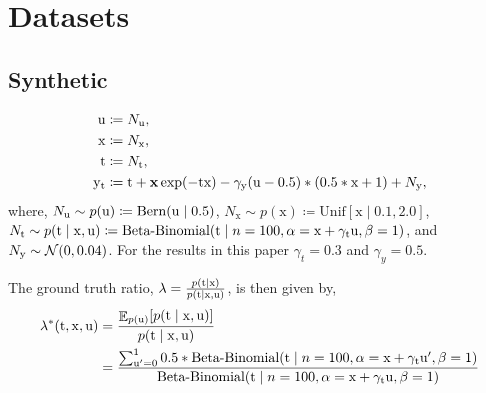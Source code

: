 \section{Datasets}
\label{app:datasets}
\subsection{Synthetic}
\label{app:synthetic}
\begin{equation}
    \begin{split}
        \mathrm{u} &\coloneqq N_{\mathrm{u}}, \\
        \mathrm{x} &\coloneqq N_{\mathrm{x}}, \\
        \mathrm{t} &\coloneqq N_{\mathrm{t}}, \\
        \mathrm{y}_{\mathrm{t}} &\coloneqq \mathrm{t} + \mathbf{x} \exp(-\mathrm{t} \mathrm{x}) - \gamma_{\mathrm{y}}(\mathrm{u} - 0.5) * (0.5 * \mathrm{x} + 1) + N_{\mathrm{y}},
    \end{split}
\end{equation}
where, 
$N_{\mathrm{u}} \sim p(\mathrm{u}) \coloneqq \text{Bern}(\mathrm{u} \mid 0.5)$, 
$N_{\mathrm{x}} \sim p(\mathrm{x}) \coloneqq \mathrm{Unif}[\mathrm{x} \mid 0.1, 2.0]$, 
$N_{\mathrm{t}} \sim p(\mathrm{\mathrm{t}} \mid \mathrm{x}, \mathrm{\mathrm{u}}) \coloneqq \text{Beta-Binomial}(\mathrm{t} \mid n=100, \alpha=\mathrm{x} + \gamma_{\mathrm{t}}\mathrm{u}, \beta=1)$, 
and $N_{\mathrm{y}} \sim \mathcal{N}(0, 0.04)$.
For the results in this paper $\gamma_t=0.3$ and $\gamma_y=0.5$.

The ground truth ratio, $\lambda = \frac{p(\mathrm{t} \mid \mathrm{x})}{p(\mathrm{\mathrm{t}} \mid \mathrm{x}, \mathrm{\mathrm{u}})}$, is then given by, 
\begin{equation}
\label{eq:true_lambda}
    \begin{split}
        \lambda^*(\mathrm{t}, \mathrm{x}, \mathrm{u}) 
        &= \frac{\mathop{\mathbb{E}}_{p(\mathrm{u})}[p(\mathrm{\mathrm{t}} \mid \mathrm{x}, \mathrm{\mathrm{u}})]}{p(\mathrm{\mathrm{t}} \mid \mathrm{x}, \mathrm{\mathrm{u}})} \\
        &= \frac{\sum_{\mathrm{u}^{\prime}=0}^1 0.5 * \text{Beta-Binomial}(\mathrm{t} \mid n=100, \alpha=\mathrm{x} + \gamma_{\mathrm{t}}\mathrm{u}^{\prime}, \beta=1) }{\text{Beta-Binomial}(\mathrm{t} \mid n=100, \alpha=\mathrm{x} + \gamma_{\mathrm{t}}\mathrm{u}, \beta=1)}
    \end{split}
\end{equation}

